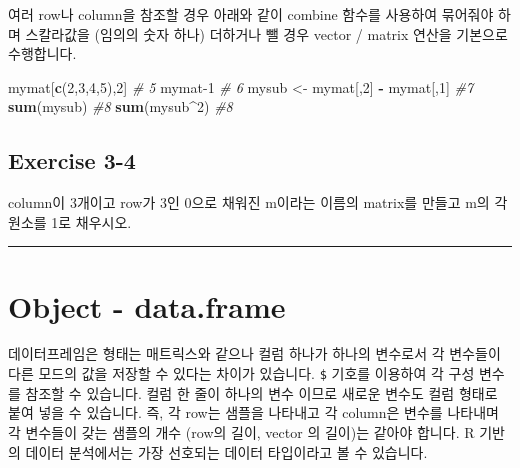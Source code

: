 \documentclass[
]{book}
\newenvironment{Shaded}{\begin{snugshade}}{\end{snugshade}}
\newcommand{\CommentTok}[1]{\textcolor[rgb]{0.56,0.35,0.01}{\textit{#1}}}
\newcommand{\DecValTok}[1]{\textcolor[rgb]{0.00,0.00,0.81}{#1}}
\newcommand{\KeywordTok}[1]{\textcolor[rgb]{0.13,0.29,0.53}{\textbf{#1}}}
\newcommand{\NormalTok}[1]{#1}
\newcommand{\OperatorTok}[1]{\textcolor[rgb]{0.81,0.36,0.00}{\textbf{#1}}}
\newcommand{\StringTok}[1]{\textcolor[rgb]{0.31,0.60,0.02}{#1}}
\begin{document}
여러 row나 column을 참조할 경우 아래와 같이 combine 함수를 사용하여 묶어줘야 하며 스칼라값을 (임의의 숫자 하나) 더하거나 뺄 경우 vector / matrix 연산을 기본으로 수행합니다.

\begin{Shaded}
\begin{Highlighting}[]
\NormalTok{mymat[}\KeywordTok{c}\NormalTok{(}\DecValTok{2}\NormalTok{,}\DecValTok{3}\NormalTok{,}\DecValTok{4}\NormalTok{,}\DecValTok{5}\NormalTok{),}\DecValTok{2}\NormalTok{] }\CommentTok{\# 5}
\NormalTok{mymat}\DecValTok{{-}1} \CommentTok{\# 6}
\NormalTok{mysub <{-}}\StringTok{ }\NormalTok{mymat[,}\DecValTok{2}\NormalTok{] }\OperatorTok{{-}}\StringTok{ }\NormalTok{mymat[,}\DecValTok{1}\NormalTok{] }\CommentTok{\#7}
\KeywordTok{sum}\NormalTok{(mysub) }\CommentTok{\#8}
\KeywordTok{sum}\NormalTok{(mysub}\OperatorTok{\^{}}\DecValTok{2}\NormalTok{) }\CommentTok{\#8}
\end{Highlighting}
\end{Shaded}

\hypertarget{exercise-3-4}{%
\subsection{Exercise 3-4}\label{exercise-3-4}}

column이 3개이고 row가 3인 0으로 채워진 m이라는 이름의 matrix를 만들고 m의 각 원소를 1로 채우시오.

\begin{center}\rule{0.5\linewidth}{0.5pt}\end{center}

\hypertarget{object---data.frame}{%
\section{Object - data.frame}\label{object---data.frame}}

데이터프레임은 형태는 매트릭스와 같으나 컬럼 하나가 하나의 변수로서 각 변수들이 다른 모드의 값을 저장할 수 있다는 차이가 있습니다. \texttt{\$} 기호를 이용하여 각 구성 변수를 참조할 수 있습니다. 컬럼 한 줄이 하나의 변수 이므로 새로운 변수도 컬럼 형태로 붙여 넣을 수 있습니다. 즉, 각 row는 샘플을 나타내고 각 column은 변수를 나타내며 각 변수들이 갖는 샘플의 개수 (row의 길이, vector 의 길이)는 같아야 합니다. R 기반의 데이터 분석에서는 가장 선호되는 데이터 타입이라고 볼 수 있습니다.
\end{document}
